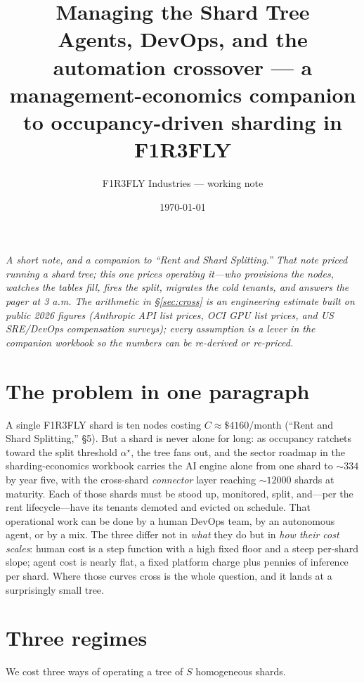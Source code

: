 \documentclass[11pt]{article}
\title{\color{f1r3red}\bfseries Managing the Shard Tree\\[2pt]
\large\color{f1r3ink}\mdseries Agents, DevOps, and the automation crossover ---
a management-economics companion to occupancy-driven sharding in F1R3FLY}
\author{\normalsize F1R3FLY Industries --- working note}
\date{\normalsize \today}
\newcommand{\shards}{S}
\begin{document}
\maketitle

\noindent\textit{A short note, and a companion to ``Rent and Shard Splitting.'' That note priced
\emph{running} a shard tree; this one prices \emph{operating} it---who provisions the nodes, watches
the tables fill, fires the split, migrates the cold tenants, and answers the pager at 3 a.m. The
arithmetic in \S\ref{sec:cross} is an engineering estimate built on public 2026 figures (Anthropic
API list prices, OCI GPU list prices, and US SRE/DevOps compensation surveys); every assumption is a
lever in the companion workbook so the numbers can be re-derived or re-priced.}

\section{The problem in one paragraph}

A single F1R3FLY shard is ten nodes costing $C\approx\$\num{4160}$/month
(``Rent and Shard Splitting,'' \S5). But a shard is never alone for long: as occupancy ratchets
toward the split threshold $\alpha^\star$, the tree fans out, and the sector roadmap in the
sharding-economics workbook carries the AI engine alone from one shard to $\sim\!\num{334}$ by
year five, with the cross-shard \emph{connector} layer reaching $\sim\!\num{12000}$ shards at
maturity. Each of those shards must be stood up, monitored, split, and---per the rent
lifecycle---have its tenants demoted and evicted on schedule. That operational work can be done by
a human DevOps team, by an autonomous agent, or by a mix. The three differ not in \emph{what} they
do but in \emph{how their cost scales}: human cost is a step function with a high fixed floor and a
steep per-shard slope; agent cost is nearly flat, a fixed platform charge plus pennies of inference
per shard. Where those curves cross is the whole question, and it lands at a surprisingly small
tree.

\section{Three regimes}
\label{sec:regimes}

We cost three ways of operating a tree of $\shards$ homogeneous shards.
\end{document}
